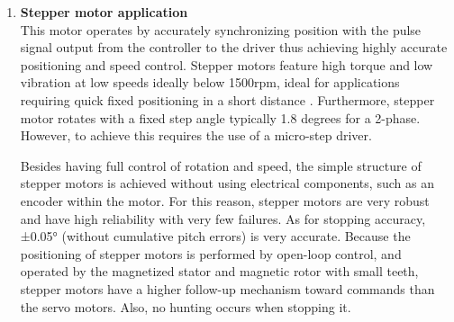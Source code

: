 \begin{enumerate}
    \item \textbf{Stepper motor application}\\
    This motor operates by accurately synchronizing position with the pulse signal output from the controller to the driver thus achieving highly accurate positioning and speed control. Stepper motors feature high torque and low vibration at low speeds ideally below 1500rpm, ideal for applications requiring quick fixed positioning in a short distance \cite{wargula2017investigations}. Furthermore, stepper motor rotates with a fixed step angle typically 1.8 degrees for a 2-phase. However, to achieve this requires the use of a micro-step driver.
    \par
    Besides having full control of rotation and speed, the simple structure of stepper motors is achieved without using electrical components, such as an encoder within the motor. For this reason, stepper motors are very robust and have high reliability with very few failures. As for stopping accuracy, ±0.05° (without cumulative pitch errors) is very accurate\cite{wargula2017investigations}. Because the positioning of stepper motors is performed by open-loop control, and operated by the magnetized stator and magnetic rotor with small teeth, stepper motors have a higher follow-up mechanism toward commands than the servo motors. Also, no hunting occurs when stopping it.
    

\end{enumerate}
